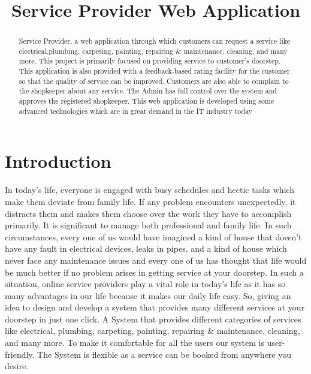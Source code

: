 \documentclass[conference]{IEEEtran}
\begin{document}
\title{Service Provider Web Application}

\author{
}


\maketitle

\begin{abstract}
Service Provider, a web application through which customers
can request a service like electrical,plumbing, carpeting, painting,
repairing & maintenance, cleaning, and many more. This project is primarily
focused on providing service to customer’s doorstep.
This application is also provided with a feedback-based
rating facility for the customer so that the quality of
service can be improved. Customers are also able to
complain to the shopkeeper about any service. The
Admin has full control over the system and approves the
registered shopkeeper. This web application is
developed using some advanced technologies which are
in great demand in the IT industry today
\end{abstract}



\section{Introduction}
In today’s life, everyone is engaged with busy schedules and
hectic tasks which make them deviate from family life. If any
problem encounters unexpectedly, it distracts them and
makes them choose over the work they have to accomplish
primarily. It is significant to manage both professional and
family life. In such circumstances, every one of us would
have imagined a kind of house that doesn’t have any fault in
electrical devices, leaks in pipes, and a kind of house which
never face any maintenance issues and every one of us has
thought that life would be much better if no problem arises in
getting service at your doorstep. In such a situation, online
service providers play a vital role in today’s life as it has so
many advantages in our life because it makes our daily life
easy. So, giving an idea to design and develop a system that
provides many different services at your doorstep in just one
click. A System that provides different categories of services
like electrical, plumbing, carpeting, painting, repairing &
maintenance, cleaning, and many more. To make it
comfortable for all the users our system is user-friendly. The
System is flexible as a service can be booked from
anywhere you desire.
\end{document}
